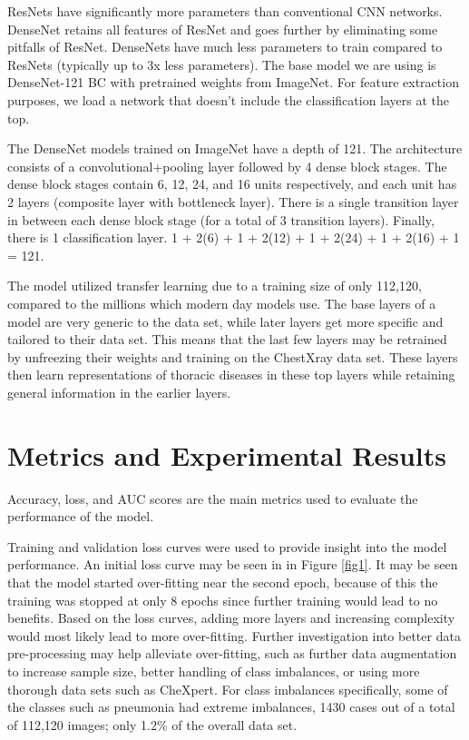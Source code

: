 \documentclass{amia}
\begin{document}
ResNets have significantly more parameters than conventional CNN networks. DenseNet retains all features of ResNet and goes further by eliminating some pitfalls of ResNet. DenseNets have much less parameters to train compared to ResNets (typically up to 3x less parameters). The base model we are using is DenseNet-121 BC with pretrained weights from ImageNet. For feature extraction purposes, we load a network that doesn't include the classification layers at the top.

The DenseNet models trained on ImageNet have a depth of 121. The architecture consists of a convolutional+pooling layer followed by 4 dense block stages. The dense block stages contain 6, 12, 24, and 16 units respectively, and each unit has 2 layers (composite layer with bottleneck layer). There is a single transition layer in between each dense block stage (for a total of 3 transition layers). Finally, there is 1 classification layer. 1 + 2(6) + 1 + 2(12) + 1 + 2(24) + 1 + 2(16) + 1 = 121.

The model utilized transfer learning due to a training size of only 112,120, compared to the millions which modern day models use. The base layers of a model are very generic to the data set, while later layers get more specific and tailored to their data set. This means that the last few layers may be retrained by unfreezing their weights and training on the ChestXray data set. These layers then learn representations of thoracic diseases in these top layers while retaining general information in the earlier layers.

\section*{Metrics and Experimental Results}
Accuracy, loss, and AUC scores are the main metrics used to evaluate the performance of the model.


Training and validation loss curves were used to provide insight into the model performance. An initial loss curve may be seen in in Figure \ref{fig1}. It may be seen that the model started over-fitting near the second epoch, because of this the training was stopped at only 8 epochs since further training would lead to no benefits. Based on the loss curves, adding more layers and increasing complexity would most likely lead to more over-fitting. Further investigation into better data pre-processing may help alleviate over-fitting, such as further data augmentation to increase sample size, better handling of class imbalances, or using more thorough data sets such as CheXpert. For class imbalances specifically, some of the classes such as pneumonia had extreme imbalances, 1430  cases  out  of  a total of 112,120 images;  only 1.2\% of the overall data set.
\end{document}
